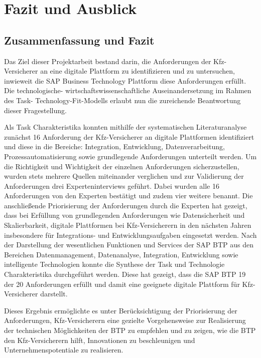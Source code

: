 \chapter{Fazit und Ausblick}

\section{Zusammenfassung und Fazit}

Das Ziel dieser Projektarbeit bestand darin, die Anforderungen der Kfz-Versicherer an eine digitale Plattform zu identifizieren und zu untersuchen, inwieweit die SAP Business Technology Plattform diese Anforderungen erfüllt. Die technologische- wirtschaftswissenschaftliche Auseinandersetzung im Rahmen des Task- Technology-Fit-Modells erlaubt nun die zureichende Beantwortung dieser Fragestellung.

Als Task Charakteristika konnten mithilfe der systematischen Literaturanalyse zunächst 16 Anforderung der Kfz-Versicherer an digitale Plattformen identifiziert und diese in die Bereiche: Integration, Entwicklung, Datenverarbeitung, Prozessautomatisierung sowie grundlegende Anforderungen unterteilt werden. Um die Richtigkeit und Wichtigkeit der einzelnen Anforderungen sicherzustellen, wurden stets mehrere Quellen miteinander verglichen und zur Validierung der Anforderungen drei Experteninterviews geführt. Dabei wurden alle 16 Anforderungen von den Experten bestätigt und zudem vier weitere benannt. Die anschließende Priorisierung der Anforderungen durch die Experten hat gezeigt, dass bei Erfüllung von grundlegenden Anforderungen wie Datensicherheit und Skalierbarkeit, digitale Plattformen bei Kfz-Versicherern in den nächsten Jahren insbesondere für Integrations- und Entwicklungsaufgaben eingesetzt werden. Nach der Darstellung der wesentlichen Funktionen und Services der SAP BTP aus den Bereichen Datenmanagement, Datenanalyse, Integration, Entwicklung sowie intelligente Technologien konnte die Synthese der Task und Technologie Charakteristika durchgeführt werden. Diese hat gezeigt, dass die SAP BTP 19 der 20 Anforderungen erfüllt und damit eine geeignete digitale Plattform für Kfz-Versicherer darstellt. 

Dieses Ergebnis ermöglichte es unter Berücksichtigung der Priorisierung der Anforderungen, Kfz-Versicherern eine gezielte Vorgehensweise zur Realisierung der technischen Möglichkeiten der BTP zu empfehlen und zu zeigen, wie die BTP den Kfz-Versicherern hilft, Innovationen zu beschleunigen und Unternehmenspotentiale zu realisieren.

